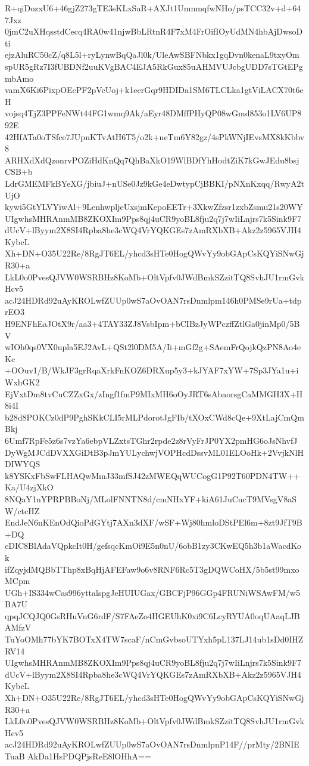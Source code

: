 R+qiDozxU6+46gjZ273gTE3sKLxSaR+AXJt1UmnmqfwNHo/psTCC32v+d+647Jxz
0jmC2uXHqsstdCecq4RA0w41njwBbLRtnR4F7xM4FrOifIOyUdMN4hbAjDwsoDti
ejzAluRC50cZ/q8L5l+ryLynwBqQaJl0k/UleAwSBFNbkx1gqDvn0kenaL9txyOm
spUR5gRz7I3fUBDNf2uuKVgBAC4EJA5RkGux85uAHMVUJcbgUDD7sTGtEPgmbAmo
vamX6Ki6PixpOEcPF2pVcUoj+k1ecrGqr9HDIDa1SM6TLCLka1gtViLACX70t6eH
vojsq4TjZ3PPFeNWt44FG1wmq9Ak/aEyr48DMffPHyQP08wGmd853o1LV6UP892E
42HfATa0oTSfce7JUpnKTvAtH6T5/o2k+neTm6Y82gz/4sPkWNjIEvsMX8kKbbv8
ARHXdXdQzonrvPOZiHdKnQq7QhBaXkO19WlBDfYhHodtZiK7kGwJEdu8bsjCSB+b
LdrGMEMFkBYeXG/jbiuJ+nUSe0Jz9kGe4eDwtypCjBBKI/pNXnKxqq/RwyA2tUjO
kywi5GtYLVYiwAl+9LenhwpljeUxsjmKepoEETr+3XkwZfzsr1zxbZsmu21s20WY
UIgwhsMHRAnmMB8ZKOXIm9Pps8qj4uCR9yoBL8fju2q7j7wIiLnjrs7k5Sink9F7
dUcV+lByym2X8SI4Rpba8he3cWQ4VrYQKGEs7zAmRXbXB+Akz2z5965VJH4KybcL
Xh+DN+O35U22Re/8RgJT6EL/yhcd3sHTe0HogQWvYy9obGApCsKQYiSNwGjR30+a
LkL0o0PvesQJVW0WSRBHz8KoMb+OltVpfv0JWdBmkSZzitTQ8SvhJU1rmGvkHcv5
acJ24HDRd92uAyKROLwfZUUp0wS7aOvOAN7rsDnmlpm146h0PMSe9rUa+tdprEO3
H9ENFhEaJOtX9r/aa3+4TAY33ZJ8VsbIpm+bCIBzJyWPczffZtlGa0jinMp0/5BV
wIOh0qs0VX0upla5EJ2AvL+QSt2l0DM5A/Ii+mGf2g+SAemFrQojkQzPN8Ao4eKc
+OOuv1/B/WkJF3grRqaXrkFnKOZ6DRXup5y3+kJYAF7xYW+7Sp3JYa1u+iWxhGK2
EjVxtDm8tvCuCZZxGx/zIngf1fmP9MIxMH6oOyJRT6sAbaorsgCaMMGH3X+H8i4I
b28d8POKCz0dP9PghSKkCLI5rMLPdorotJgFIb/tXOxCWd8cQe+9XtLajCmQmBkj
6Umf7RpFe5z6s7vzYa6ebpVLZxtsTGhr2rpde2z8rVyFrJP0YX2pmHG6oJsNhvfJ
DyWgMJCdDVXXGiDtB3pJmYULychwjVOPHcdDssvML01ELOoHk+2VvjkNlHDIWYQS
k8YSKxFbSwFLHAQwMmJ33mfSJ42zMWEQqWUCogG1P92T60PDN4TW++Ka/U4zjXkO
8NQaY1nYPRPBBoNj/MLolFNNTN8d/cmNHxYF+kiA61JuCucT9MVsgV8aSW/ctcHZ
EndJeN6nKEnOdQioPdGYtj7AXn3dXF/wSF+Wj80hmloDStPEl6m+8zt9JfT9B+DQ
cDIC8BlAdaVQpkcIt0H/gefsqcKmOi9E5n0nU/6obB1zy3CKwEQ5h3b1aWacdKok
ifZqyjdMQBbTThp8xBqHjAFEFaw9o6v8RNF6Rc5T3gDQWCoHX/5b5st99mxoMCpm
UGh+IS334wCas996yttalspgJeHUIUGax/GBCFjP96GGp4FRUNiWSAwFM/w5BA7U
qpqJCQJQ0GsRHuVnG6rdF/S7FAeZo4HGEUhK0xi9C6LcyRYUA0oqUAaqLJBAMfzV
TuYoOMh77bYK7BOTxX4TW7scaF/nCmGvbsoUTYxh5pL137LJ14ub1sDd0IHZRV14
UIgwhsMHRAnmMB8ZKOXIm9Pps8qj4uCR9yoBL8fju2q7j7wIiLnjrs7k5Sink9F7
dUcV+lByym2X8SI4Rpba8he3cWQ4VrYQKGEs7zAmRXbXB+Akz2z5965VJH4KybcL
Xh+DN+O35U22Re/8RgJT6EL/yhcd3sHTe0HogQWvYy9obGApCsKQYiSNwGjR30+a
LkL0o0PvesQJVW0WSRBHz8KoMb+OltVpfv0JWdBmkSZzitTQ8SvhJU1rmGvkHcv5
acJ24HDRd92uAyKROLwfZUUp0wS7aOvOAN7rsDnmlpnP14F//prMty/2BNIETuaB
AkDa1HsPDQPjsReE8lOHhA==
